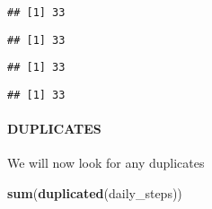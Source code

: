 \documentclass[
]{article}
\newenvironment{Shaded}{\begin{snugshade}}{\end{snugshade}}
\newcommand{\FunctionTok}[1]{\textcolor[rgb]{0.13,0.29,0.53}{\textbf{#1}}}
\newcommand{\NormalTok}[1]{#1}
\newcommand{\SpecialCharTok}[1]{\textcolor[rgb]{0.81,0.36,0.00}{\textbf{#1}}}
\begin{document}
\begin{Shaded}
\end{Shaded}

\begin{verbatim}
## [1] 33
\end{verbatim}

\begin{Shaded}
\end{Shaded}

\begin{verbatim}
## [1] 33
\end{verbatim}

\begin{Shaded}
\end{Shaded}

\begin{verbatim}
## [1] 33
\end{verbatim}

\begin{Shaded}
\end{Shaded}

\begin{verbatim}
## [1] 33
\end{verbatim}

\hypertarget{duplicates}{%
\paragraph{DUPLICATES}\label{duplicates}}

We will now look for any duplicates

\begin{Shaded}
\begin{Highlighting}[]
\FunctionTok{sum}\NormalTok{(}\FunctionTok{duplicated}\NormalTok{(daily\_steps))}
\end{Highlighting}
\end{Shaded}
\end{document}
